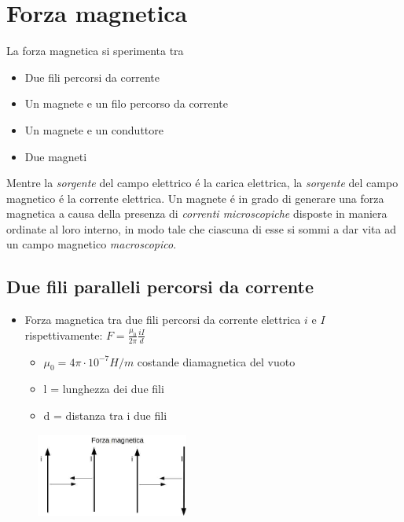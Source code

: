 \documentclass[17pt]{article}
\begin{document}
\section{Forza magnetica}

La forza magnetica si sperimenta tra
\begin{itemize}
	\item Due fili percorsi da corrente
	\item Un magnete e un filo percorso da corrente
	\item Un magnete e un conduttore 
	\item Due magneti
\end{itemize}

Mentre la \emph{sorgente} del campo elettrico \'e la carica elettrica, la \emph{sorgente} del campo magnetico \'e la corrente elettrica. Un magnete \'e in grado di generare una forza magnetica a causa della presenza di \emph{correnti microscopiche} disposte in maniera ordinate al loro interno, in modo tale che ciascuna di esse si sommi a dar vita ad un campo magnetico \emph{macroscopico}.

\subsection{Due fili paralleli percorsi da corrente}

\begin{itemize}
	\item Forza magnetica tra due fili percorsi da corrente elettrica $i$ e $I$ rispettivamente: $F = \frac{\mu_0}{2\pi} \frac{iI}{d}$
	\begin{itemize}
		\item $\mu_0 = 4\pi\cdot 10^{-7}H/m$ costande diamagnetica del vuoto
		\item l = lunghezza dei due fili
		\item d = distanza tra i due fili
	\end{itemize}
\end{itemize}


\begin{figure}[th]
\includegraphics[width=5cm]{forzaMagnetica.jpg}
\centering
\end{figure}
\end{document}
